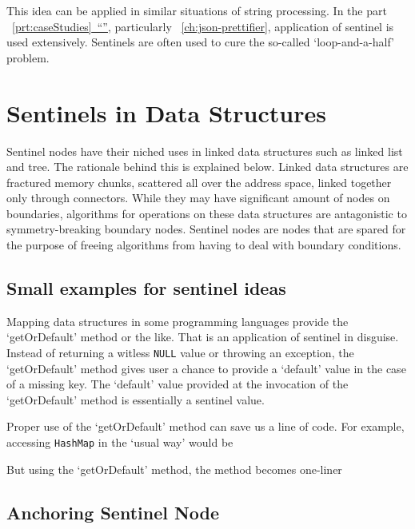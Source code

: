 \documentclass[oneside,11pt]{book}
\theoremstyle{definition}
\theoremstyle{remark}
\newcommand{\code}[1]{\mbox{\lstinline{#1}}}
\newcommand*{\fullref}[1]{\hyperref[{#1}]{\mbox{\autoref*{#1}~}``\nameref*{#1}''}}
\begin{document}
This idea can be applied in similar situations of string processing.
In the part ~\fullref{prt:caseStudies}, particularly ~\autoref{ch:json-prettifier}, application of
sentinel is used extensively.
Sentinels are often used to cure the so-called `loop-and-a-half' problem.


\section{Sentinels in Data Structures}\label{sec:sentinelsInDS}

Sentinel nodes have their niched uses in linked data structures such as linked list and tree.
The rationale behind this is explained below.
Linked data structures are fractured memory chunks, scattered all over the address space,
linked together only through connectors.
While they may have significant amount of nodes on boundaries,
algorithms for operations on these data structures are antagonistic to symmetry-breaking boundary
nodes.
Sentinel nodes are nodes that are spared for the purpose of freeing algorithms from having to
deal with boundary conditions.

\subsection{Small examples for sentinel ideas}\label{subsec:small-examples-for-sentinel-ideas}

Mapping data structures in some programming languages provide the `getOrDefault' method or the
like.
That is an application of sentinel in disguise.
Instead of returning a witless \code{NULL} value or throwing an exception,
the `getOrDefault' method gives user a chance to provide a `default' value
in the case of a missing key.
The `default' value provided at the invocation of the `getOrDefault' method
is essentially a sentinel value.

Proper use of the `getOrDefault' method can save us a line of code.
For example, accessing \code{HashMap} in the `usual way' would be

But using the `getOrDefault' method, the method becomes one-liner



\subsection{Anchoring Sentinel Node}\label{subsec:anchoringSentinels}
\end{document}
